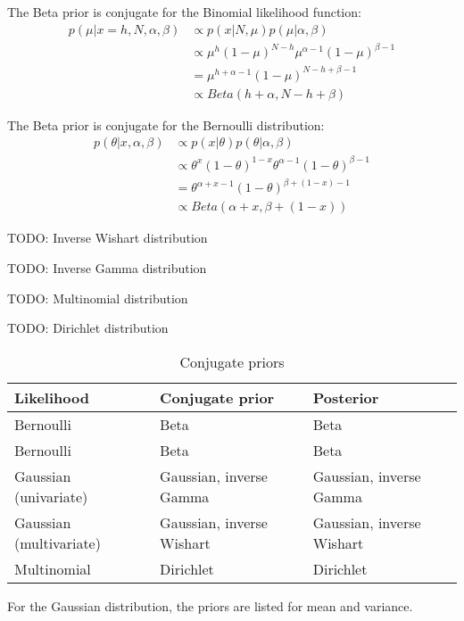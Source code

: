 The Beta prior is conjugate for the Binomial likelihood function:
\begin{align*}
    p(\mu | x = h, N, \alpha, \beta) &\propto p(x | N, \mu) p(\mu | \alpha, \beta) \\
    &\propto \mu^h (1 - \mu)^{N - h} \mu^{\alpha - 1} (1-\mu)^{\beta - 1} \\
    &= \mu^{h + \alpha - 1} (1 - \mu)^{N - h + \beta - 1} \\
    &\propto Beta(h + \alpha, N - h + \beta)
\end{align*}

The Beta prior is conjugate for the Bernoulli distribution:
\begin{align*}
    p(\theta | x, \alpha, \beta) &\propto p(x | \theta) p(\theta | \alpha, \beta) \\
    &\propto \theta^x (1 - \theta)^{1-x} \theta^{\alpha-1}(1-\theta)^{\beta - 1} \\
    &= \theta^{\alpha + x - 1} (1 - \theta)^{\beta + (1 - x) - 1} \\
    &\propto Beta(\alpha + x, \beta + (1 - x))
\end{align*}

TODO: Inverse Wishart distribution

TODO: Inverse Gamma distribution

TODO: Multinomial distribution

TODO: Dirichlet distribution

\begin{table}[]
\begin{tabular}{@{}lll@{}}
\toprule
Likelihood  & Conjugate prior          & Posterior                \\ \midrule
Bernoulli   & Beta                     & Beta                     \\
Bernoulli   & Beta                     & Beta                     \\
Gaussian (univariate)      & Gaussian, inverse Gamma   & Gaussian, inverse Gamma   \\
Gaussian (multivariate)    & Gaussian, inverse Wishart & Gaussian, inverse Wishart \\
Multinomial & Dirichlet                & Dirichlet                \\ \bottomrule
\end{tabular}
\caption {Conjugate priors}
\end{table}
For the Gaussian distribution, the priors are listed for mean and variance.

